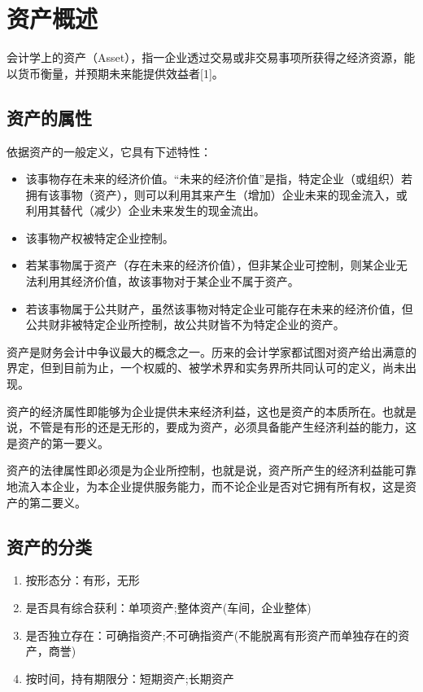 \section {资产概述}

    会计学上的资产（Asset），指一企业透过交易或非交易事项所获得之经济资源，能以货币衡量，并预期未来能提供效益者[1]。

\subsection {资产的属性}

    依据资产的一般定义，它具有下述特性：
    \begin{itemize}
        \item  该事物存在未来的经济价值。“未来的经济价值”是指，特定企业（或组织）若拥有该事物（资产），则可以利用其来产生（增加）企业未来的现金流入，或利用其替代（减少）企业未来发生的现金流出。
        \item  该事物产权被特定企业控制。
        \item  若某事物属于资产（存在未来的经济价值），但非某企业可控制，则某企业无法利用其经济价值，故该事物对于某企业不属于资产。
        \item  若该事物属于公共财产，虽然该事物对特定企业可能存在未来的经济价值，但公共财非被特定企业所控制，故公共财皆不为特定企业的资产。
    \end{itemize}

    资产是财务会计中争议最大的概念之一。历来的会计学家都试图对资产给出满意的界定，但到目前为止，一个权威的、被学术界和实务界所共同认可的定义，尚未出现。

    资产的经济属性即能够为企业提供未来经济利益，这也是资产的本质所在。也就是说，不管是有形的还是无形的，要成为资产，必须具备能产生经济利益的能力，这是资产的第一要义。

    资产的法律属性即必须是为企业所控制，也就是说，资产所产生的经济利益能可靠地流入本企业，为本企业提供服务能力，而不论企业是否对它拥有所有权，这是资产的第二要义。　　

\subsection {资产的分类}

    \begin{enumerate}
　　\item  按形态分：有形，无形
　　\item  是否具有综合获利：单项资产;整体资产(车间，企业整体)
　　\item  是否独立存在：可确指资产;不可确指资产(不能脱离有形资产而单独存在的资产，商誉)
　　\item  按时间，持有期限分：短期资产;长期资产
    \end{enumerate}

